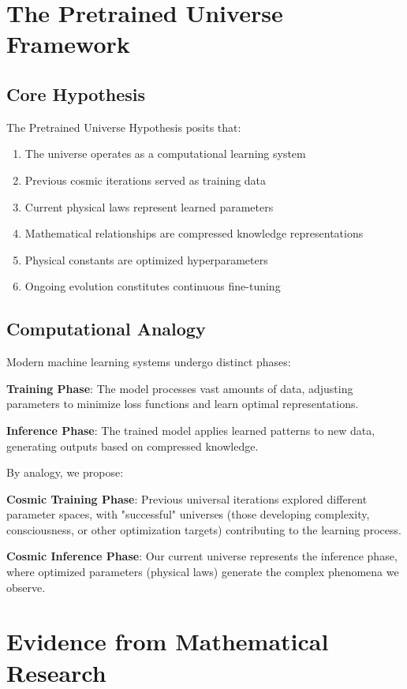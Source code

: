\documentclass[12pt]{article}
\begin{document}
\section{The Pretrained Universe Framework}

\subsection{Core Hypothesis}

The Pretrained Universe Hypothesis posits that:

\begin{enumerate}
\item The universe operates as a computational learning system
\item Previous cosmic iterations served as training data
\item Current physical laws represent learned parameters
\item Mathematical relationships are compressed knowledge representations
\item Physical constants are optimized hyperparameters
\item Ongoing evolution constitutes continuous fine-tuning
\end{enumerate}

\subsection{Computational Analogy}

Modern machine learning systems undergo distinct phases:

\textbf{Training Phase}: The model processes vast amounts of data, adjusting parameters to minimize loss functions and learn optimal representations.

\textbf{Inference Phase}: The trained model applies learned patterns to new data, generating outputs based on compressed knowledge.

By analogy, we propose:

\textbf{Cosmic Training Phase}: Previous universal iterations explored different parameter spaces, with "successful" universes (those developing complexity, consciousness, or other optimization targets) contributing to the learning process.

\textbf{Cosmic Inference Phase}: Our current universe represents the inference phase, where optimized parameters (physical laws) generate the complex phenomena we observe.

\section{Evidence from Mathematical Research}
\end{document}

